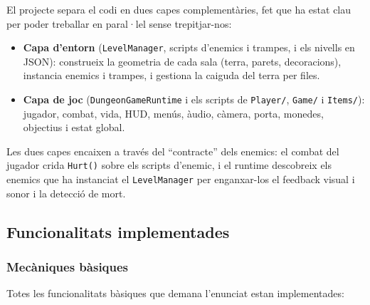 \documentclass[11pt,a4paper]{article}
\begin{document}
El projecte separa el codi en dues capes complementàries, fet que ha estat clau
per poder treballar en paral·lel sense trepitjar-nos:

\begin{itemize}[noitemsep]
    \item \textbf{Capa d'entorn} (\texttt{LevelManager}, scripts d'enemics i
    trampes, i els nivells en JSON): construeix la geometria de cada sala
    (terra, parets, decoracions), instancia enemics i trampes, i gestiona la
    caiguda del terra per files.
    \item \textbf{Capa de joc} (\texttt{DungeonGameRuntime} i els scripts de
    \texttt{Player/}, \texttt{Game/} i \texttt{Items/}): jugador, combat, vida,
    HUD, menús, àudio, càmera, porta, monedes, objectius i estat global.
\end{itemize}

Les dues capes encaixen a través del ``contracte'' dels enemics: el combat del
jugador crida \texttt{Hurt()} sobre els scripts d'enemic, i el runtime descobreix
els enemics que ha instanciat el \texttt{LevelManager} per enganxar-los el
feedback visual i sonor i la detecció de mort.

\subsection{Funcionalitats implementades}

\subsubsection{Mecàniques bàsiques}

Totes les funcionalitats bàsiques que demana l'enunciat estan implementades:
\end{document}
